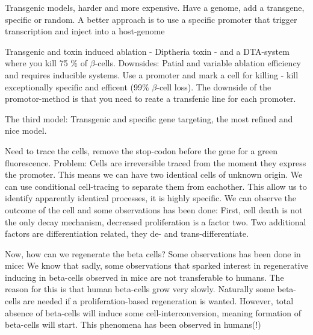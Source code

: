 \documentclass[12p]{article}
\begin{document}
Transgenic models, harder and more expensive.
Have a genome, add a transgene, specific or random. 
A better approach is to use a specific promoter that trigger transcription and inject into a host-genome

Transgenic and toxin induced ablation - Diptheria toxin - and a DTA-system where you kill 75 \% of $\beta$-cells.
Downsides: Patial and variable ablation efficiency and requires inducible systems.
Use a promoter and mark a cell for killing - kill exceptionally specific and efficent (99\% $\beta$-cell loss).
The downside of the promotor-method is that you need to reate a transfenic line for each promoter.

The third model: Transgenic and specific gene targeting, the most refined and nice model.

Need to trace the cells, remove the stop-codon before the gene for a green fluorescence.
Problem: Cells are irreversible traced from the moment they express the promoter.
This means we can have two identical cells of unknown origin.
We can use conditional cell-tracing to separate them from eachother.
This allow us to identify apparently identical processes, it is highly specific.
We can observe the outcome of the cell and some observations has been done:
First, cell death is not the only decay mechanism, decreased proliferation is a factor two.
Two additional factors are differentiation related, they de- and trans-differentiate.

Now, how can we regenerate the beta cells?
Some observations has been done in mice:
We know that sadly, some observations that sparked interest in regenerative inducing in beta-cells observed in mice are not transferable to humans.
The reason for this is that human beta-cells grow very slowly.
Naturally some beta-cells are needed if a proliferation-based regeneration is wanted.
However, total absence of beta-cells will induce some cell-interconversion, meaning formation of beta-cells will start.
This phenomena has been observed in humans(!)
\end{document}
